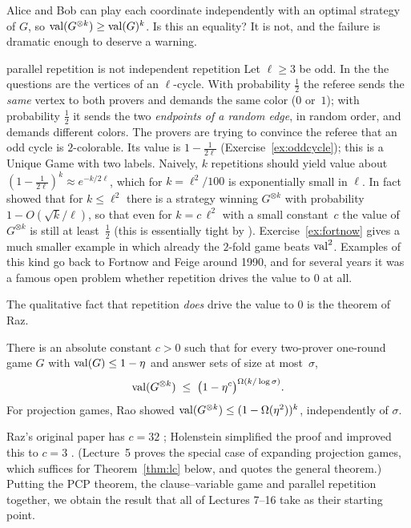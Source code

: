 Alice and Bob can play each coordinate independently with an optimal strategy of $G$, so
$\operatorname{val}(G^{\otimes k})\ge\operatorname{val}(G)^k$.  Is this an equality?  It is not, and the failure is
dramatic enough to deserve a warning.

\begin{pitfall}{parallel repetition is not independent repetition}
Let $\ell\ge3$ be odd.  In the  the questions are the vertices of an
$\ell$-cycle.  With probability $\tfrac12$ the referee sends the \emph{same} vertex to both provers and
demands the same color ($0$ or~$1$); with probability $\tfrac12$ it sends the two \emph{endpoints
of a random edge}, in random order, and demands different colors.  The provers are trying to convince
the referee that an odd cycle is $2$-colorable.  Its value is $1-\tfrac1{2\ell}$ (Exercise~\ref{ex:oddcycle});
this is a Unique Game with two labels.  Naively, $k$ repetitions should yield value about
$(1-\tfrac1{2\ell})^k\approx e^{-k/2\ell}$, which for $k=\ell^2/100$ is exponentially small in $\ell$.
In fact \citet{Raz11} showed that for $k\le\ell^2$ there is a strategy winning $G^{\otimes k}$ with
probability $1-O(\sqrt k/\ell)$, so that even for $k=c\,\ell^2$ with a small constant~$c$ the
value of $G^{\otimes k}$ is still at least~$\tfrac12$ (this is essentially tight by \citealp{FKO07}).
Exercise~\ref{ex:fortnow} gives a much smaller example in which already the $2$-fold game beats $\operatorname{val}^2$.
Examples of this kind go back to Fortnow and Feige around 1990, and for several years it was a
famous open problem whether repetition drives the value to $0$ at all.
\end{pitfall}

The qualitative fact that repetition \emph{does} drive the value to $0$ is the theorem of Raz.

\begin{theorem}\label{thm:raz}
There is an absolute constant $c>0$ such that for every two-prover one-round game $G$ with
$\operatorname{val}(G)\le1-\eta$ and answer sets of size at most~$\sigma$,
\[
  \operatorname{val}(G^{\otimes k})\;\le\;\bigl(1-\eta^{c}\bigr)^{\Omega(k/\log\sigma)}.
\]
For projection games, Rao showed $\operatorname{val}(G^{\otimes k})\le(1-\Omega(\eta^2))^k$, independently of $\sigma$.
\end{theorem}

\noindent
Raz's original paper has $c=32$ \citep{Raz98}; Holenstein simplified the proof and improved this to $c=3$
\citep{Holenstein09}.  (Lecture~5 proves the special case of expanding projection games, which suffices for Theorem~\ref{thm:lc} below, and quotes the general theorem.)  Putting the PCP theorem, the
clause--variable game and parallel repetition together, we obtain the result that all of
Lectures 7--16 take as their starting point.

